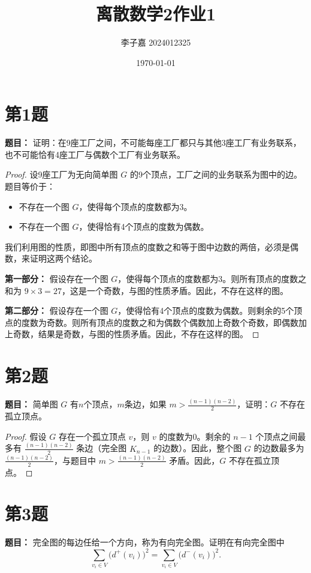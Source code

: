 \documentclass[utf8]{ctexart}
\title{\textbf{离散数学2\quad 作业1}}
\date{\today}
\author{李子嘉 2024012325}
\theoremstyle{mystyle}
\begin{document}
\maketitle

\section*{第1题}
\begin{problembox}
\textbf{题目：} 证明：在9座工厂之间，不可能每座工厂都只与其他3座工厂有业务联系，也不可能恰有4座工厂与偶数个工厂有业务联系。
\end{problembox}
\begin{proof}
设9座工厂为无向简单图 $G$ 的9个顶点，工厂之间的业务联系为图中的边。题目等价于：
\begin{itemize}
    \item 不存在一个图 $G$，使得每个顶点的度数都为3。
    \item 不存在一个图 $G$，使得恰有4个顶点的度数为偶数。
\end{itemize}
我们利用图的性质，即图中所有顶点的度数之和等于图中边数的两倍，必须是偶数，来证明这两个结论。

\textbf{第一部分：} 假设存在一个图 $G$，使得每个顶点的度数都为3。则所有顶点的度数之和为 $9 \times 3 = 27$，这是一个奇数，与图的性质矛盾。因此，不存在这样的图。

\textbf{第二部分：} 假设存在一个图 $G$，使得恰有4个顶点的度数为偶数。则剩余的5个顶点的度数为奇数。则所有顶点的度数之和为偶数个偶数加上奇数个奇数，即偶数加上奇数，结果是奇数，与图的性质矛盾。因此，不存在这样的图。
\end{proof}

\section*{第2题}
\begin{problembox}
\textbf{题目：} 简单图 $G$ 有$n$个顶点，$m$条边，如果 $m > \frac{(n-1)(n-2)}{2}$，证明：$G$ 不存在孤立顶点。
\end{problembox}
\begin{proof}
假设 $G$ 存在一个孤立顶点 $v$，则 $v$ 的度数为0。剩余的 $n-1$ 个顶点之间最多有 $\frac{(n-1)(n-2)}{2}$ 条边（完全图 $K_{n-1}$ 的边数）。因此，整个图 $G$ 的边数最多为 $\frac{(n-1)(n-2)}{2}$，与题目中 $m > \frac{(n-1)(n-2)}{2}$ 矛盾。因此，$G$ 不存在孤立顶点。
\end{proof}

\section*{第3题}
\begin{problembox}
\textbf{题目：} 完全图的每边任给一个方向，称为有向完全图。证明在有向完全图中
\[
  \sum_{v_i \in V} \bigl(d^+(v_i)\bigr)^2 = \sum_{v_i \in V} \bigl(d^-(v_i)\bigr)^2.
\]
\end{problembox}
\end{document}
